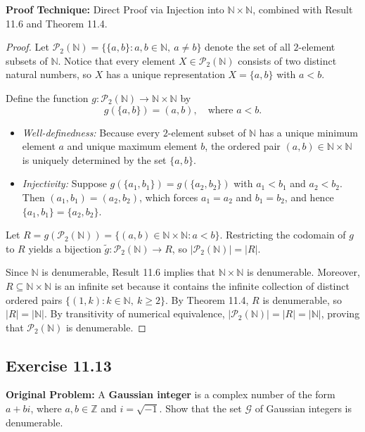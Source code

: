 \documentclass[11pt, letterpaper]{article}
\theoremstyle{definition}
\theoremstyle{remark}
\begin{document}
\textbf{Proof Technique:} Direct Proof via Injection into $\mathbb{N} \times \mathbb{N}$, combined with Result 11.6 and Theorem 11.4.

\begin{proof}
Let $\mathcal{P}_2(\mathbb{N}) = \{\{a, b\} : a, b \in \mathbb{N},\ a \neq b\}$ denote the set of all $2$-element subsets of $\mathbb{N}$. Notice that every element $X \in \mathcal{P}_2(\mathbb{N})$ consists of two distinct natural numbers, so $X$ has a unique representation $X = \{a, b\}$ with $a < b$.

Define the function $g : \mathcal{P}_2(\mathbb{N}) \to \mathbb{N} \times \mathbb{N}$ by
\[
g(\{a, b\}) = (a, b), \quad \text{where } a < b.
\]
\begin{itemize}
    \item \emph{Well-definedness:} Because every $2$-element subset of $\mathbb{N}$ has a unique minimum element $a$ and unique maximum element $b$, the ordered pair $(a, b) \in \mathbb{N} \times \mathbb{N}$ is uniquely determined by the set $\{a, b\}$.
    \item \emph{Injectivity:} Suppose $g(\{a_1, b_1\}) = g(\{a_2, b_2\})$ with $a_1 < b_1$ and $a_2 < b_2$. Then $(a_1, b_1) = (a_2, b_2)$, which forces $a_1 = a_2$ and $b_1 = b_2$, and hence $\{a_1, b_1\} = \{a_2, b_2\}$.
\end{itemize}
Let $R = g(\mathcal{P}_2(\mathbb{N})) = \{(a, b) \in \mathbb{N} \times \mathbb{N} : a < b\}$. Restricting the codomain of $g$ to $R$ yields a bijection $\tilde{g} : \mathcal{P}_2(\mathbb{N}) \to R$, so $|\mathcal{P}_2(\mathbb{N})| = |R|$.

Since $\mathbb{N}$ is denumerable, Result 11.6 implies that $\mathbb{N} \times \mathbb{N}$ is denumerable. Moreover, $R \subseteq \mathbb{N} \times \mathbb{N}$ is an infinite set because it contains the infinite collection of distinct ordered pairs $\{(1, k) : k \in \mathbb{N},\ k \ge 2\}$. By Theorem 11.4, $R$ is denumerable, so $|R| = |\mathbb{N}|$. By transitivity of numerical equivalence, $|\mathcal{P}_2(\mathbb{N})| = |R| = |\mathbb{N}|$, proving that $\mathcal{P}_2(\mathbb{N})$ is denumerable.
\end{proof}

\subsection{Exercise 11.13}

\textbf{Original Problem:} A \textbf{Gaussian integer} is a complex number of the form $a + bi$, where $a, b \in \mathbb{Z}$ and $i = \sqrt{-1}$. Show that the set $\mathcal{G}$ of Gaussian integers is denumerable.
\end{document}
